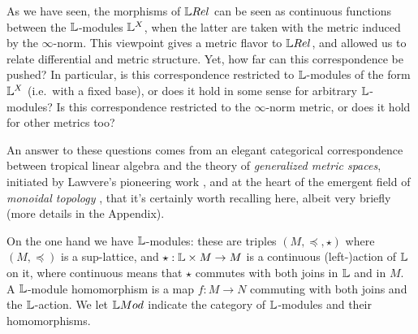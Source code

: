 

As we have seen, the morphisms of $\LREL$ can be seen as continuous functions between the $\mathbb{L}$-modules $\mathbb{L}^{X}$, when the latter are taken with the metric induced by the $\infty$-norm. This viewpoint gives a metric flavor to $\LREL$, and allowed us to relate differential and metric structure. Yet, how far can this correspondence be pushed?
In particular, is this correspondence restricted to $\mathbb{L}$-modules of the form $\mathbb{L}^{X}$ (i.e.~with a fixed base), or does it hold in some sense for arbitrary $\mathbb{L}$-modules? Is this correspondence restricted to the $\infty$-norm metric, or does it hold for other metrics too?

An answer to these questions comes from an elegant categorical correspondence between tropical linear algebra and the theory of \emph{generalized metric spaces}, initiated by Lawvere's pioneering work \cite{Lawvere1973}, and at the heart of the emergent field of \emph{monoidal topology} \cite{Hofmann2014, Stubbe2014}, that it's certainly worth recalling here, albeit very briefly (more details in the Appendix).

 
%
%
%


On the one hand we have $\mathbb{L}$-modules: these are triples $(M,\preceq, \star)$ where $(M, \preceq)$ is a sup-lattice, and $\star: \mathbb{L} \times M \to M$ is a continuous (left-)action of $\mathbb{L}$ on it, where continuous means that $\star$ commutes with both joins in $\mathbb{L}$ and in $M$. %
A $\mathbb{L}$-module homomorphism is a map $f:M\to N$ commuting with both joins and the $\mathbb{L}$-action. We let $\Mod$ indicate the category of $\mathbb{L}$-modules and their homomorphisms. 
 
